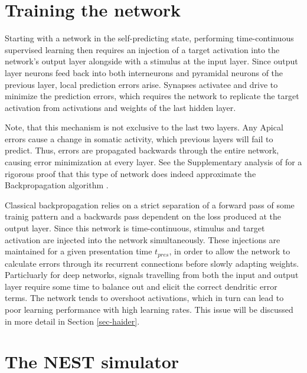 \section{Training the network}

Starting with a network in the self-predicting state, performing time-continuous supervised learning then requires an
injection of a target activation into the network's output layer alongside with a stimulus at the input layer. Since
output layer neurons feed back into both interneurons and pyramidal neurons of the previous layer, local prediction
errors arise. Synapses activatee and drive to minimize the prediction errors, which requires the network to replicate
the target activation from activations and weights of the last hidden layer.

Note, that this mechanism is not exclusive to the last two layers. Any Apical errors cause a change in somatic activity,
which previous layers will fail to predict. Thus, errors are propagated backwards through the entire network, causing
error minimization at every layer. See the Supplementary analysis of \cite{sacramento2018dendritic} for a rigorous proof
that this type of network does indeed approximate the Backpropagation algorithm .



Classical backpropagation relies on a strict separation of a forward pass of some trainig pattern and a backwards pass
dependent on the loss produced at the output layer. Since this network is time-continuous, stimulus and target
activation are injected into the network simultaneously. These injections are maintained for a given presentation time
$t_{pres}$, in order to allow the network to calculate errors through its recurrent connections before slowly adapting
weights. Particluarly for deep networks, signals travelling from both the input and output layer require some time to
balance out and elicit the correct dendritic error terms. The network tends to overshoot activations, which in turn can
lead to poor learning performance with high learning rates. This issue will be discussed in more detail in Section
\ref{sec-haider}.



\section{The NEST simulator}

